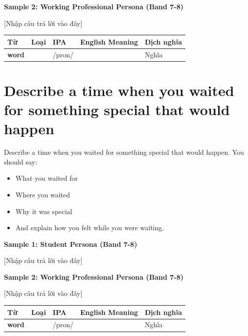 \textbf{Sample 2: Working Professional Persona (Band 7-8)}

[Nhập câu trả lời vào đây]

\separator


\vspace{0.8em}
\begin{center}
\renewcommand{\arraystretch}{1.65}
\begin{tabularx}{\textwidth}{|V{0.22\textwidth}|C{0.07\textwidth}|I{0.20\textwidth}|Y|V{0.18\textwidth}|}
\hline
{}
\textbf{Từ} & \textbf{Loại} & \textbf{IPA} & \textbf{English Meaning} & \textbf{Dịch nghĩa} \\
\hline
\textbf{word} & & /pron/ & & Nghĩa \\ \hline
\end{tabularx}
\end{center}

\newpage

\section{Describe a time when you waited for something special that would happen}
\begin{ieltsprompt}
Describe a time when you waited for something special that would happen.
You should say:
\begin{itemize}[leftmargin=2em, itemsep=2pt]
\item What you waited for
\item Where you waited
\item Why it was special
\item And explain how you felt while you were waiting.
\end{itemize}
\end{ieltsprompt}
\begin{ieltsanswer}
\textbf{Sample 1: Student Persona (Band 7-8)}

[Nhập câu trả lời vào đây]

\textbf{Sample 2: Working Professional Persona (Band 7-8)}

[Nhập câu trả lời vào đây]
\end{ieltsanswer}


\vspace{0.8em}
\begin{center}
\renewcommand{\arraystretch}{1.65}
\begin{tabularx}{\textwidth}{|V{0.22\textwidth}|C{0.07\textwidth}|I{0.20\textwidth}|Y|V{0.18\textwidth}|}
\hline
{}
\textbf{Từ} & \textbf{Loại} & \textbf{IPA} & \textbf{English Meaning} & \textbf{Dịch nghĩa} \\
\hline
\textbf{word} & & /pron/ & & Nghĩa \\ \hline
\end{tabularx}
\end{center}

